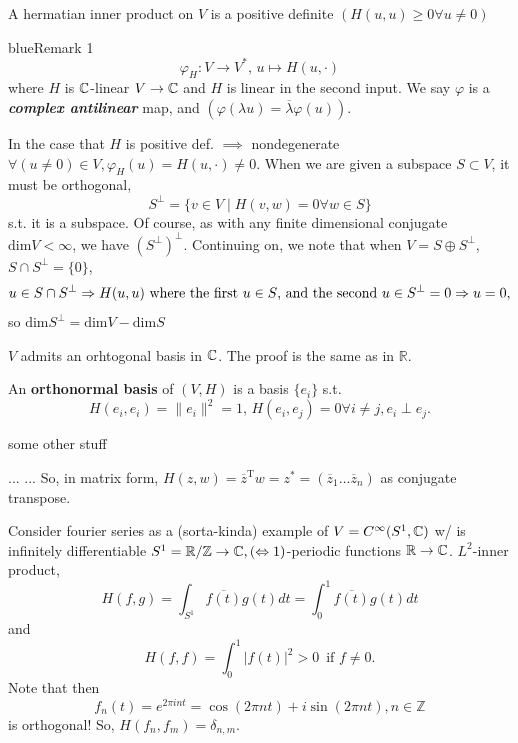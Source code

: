 \documentclass[12pt,oneside]{report}
\begin{document}
\begin{definition}
  A hermatian inner product on \( V \) is a positive definite  \(  (H(u,u)\ge 0 \forall u \neq 0) \)
\end{definition}

\begin{mybox}{blue}{Remark 1}
  \[
    \varphi _H : V \to  V^*, \, u \mapsto H(u,\cdot )
  \]
  where \( H \) is \( \CC \)-linear \( V \to  \CC \) and \( H \) is linear in the second input. We say \( \varphi  \) is a \textbf{\textit{complex antilinear}} map, and \( (\varphi (\lambda  u ) = \overline{\lambda } \varphi (u) ) \).
\end{mybox}

In the case that \( H \) is positive def. \( \implies \) nondegenerate \( \forall (u \neq 0)\in  V , \varphi _H(u)=H (u,\cdot )\neq 0\). When we are given a subspace \( S \subset  V \), it must be orthogonal, 
\[ S^\perp = \{v \in  V \mid H(v,w)=0 \forall w \in  S\}   \]
s.t. it is a subspace. Of course, as with any finite dimensional conjugate \( \text{dim}V<\infty \), we have \( (S^{\perp})^\perp \). Continuing on, we note that when \( V = S \oplus S^\perp \), \(S \cap S^\perp = \{0\} \), \[
  u \in  S \cap S^\perp \implies H(u,u) \text{ where the first \( u \in  S\), and the second \( u \in  S^\perp \)} =0 \implies u=0,
\] 
so \( \text{dim}S^\perp = \text{dim} V - \text{dim}S \)

\begin{theorem}
  \( V \) admits an orhtogonal basis in \( \CC\). The proof is the same as in \( \mathbb{R} \). 
\end{theorem}

\begin{definition}
  An \textbf{orthonormal basis} of \( (V,H) \) is a basis \( \{e_i\}   \) s.t. 
  \begin{displaymath}
    H(e_i,e_i)=\|e_i\|^2 =1, \, H(e_i,e_j)=0 \forall i\neq j, e_i \perp e_j. 
  \end{displaymath}
  
\end{definition}

some other stuff


...
...
So, in matrix form, \( H(z,w)=\overline{z}^{\text{T}}w =z^*=(\overline{z}_{1}\ldots \overline{z}_n) \) as conjugate transpose. 

Consider fourier series as a (sorta-kinda) example of \( V=C^{\infty} (S^1,\CC) \) w/ is infinitely differentiable \( S^1=\mathbb{R}/\mathbb{Z} \to  \CC, (\iff 1)\)-periodic functions \( \mathbb{R} \to  \CC \). \( L^2 \)-inner product, \[
  H(f,g)=\int_{S^1}\overline{f(t)} g(t)dt = \int_0^1 \overline{f(t)} g(t)dt\]
  and 
  \[
    H(f,f) = \int _0^1|f(t)|^2 > 0\,  \text{ if } f\neq 0
  .\] 
  Note that then \[ f_n(t) =e^{2 \pi  i nt} = \cos (2 \pi  nt) + i \sin  (2 \pi  nt), n \in  \mathbb{Z}\] is orthogonal! So, \( H(f_n,f_m)=\delta _{n,m}  \). 
\end{document}
